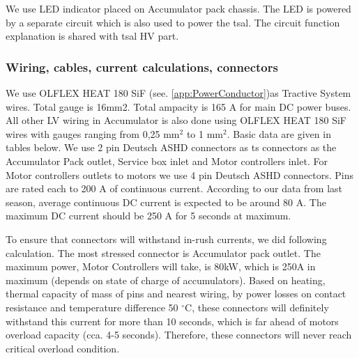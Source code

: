 We use LED indicator placed on Accumulator pack chassis. The LED is powered by a separate circuit which is also used to power the \gls{tsal}. The circuit function explanation is shared with \gls{tsal} HV part. 

\subsubsection{Wiring, cables, current calculations, connectors}\label{subsec:acp_wiring}


We use OLFLEX HEAT 180 SiF (see. \ref{app:PowerConductor})as Tractive System wires. Total gauge is 16mm2. Total ampacity is 165 A for main DC power buses. All other LV wiring in Accumulator is also done using OLFLEX HEAT 180 SiF wires with gauges ranging from 0,25 mm$^2$ to 1 mm$^2$. Basic data are given in tables below. We use 2 pin Deutsch ASHD connectors as \gls{ts} connectors as the Accumulator Pack outlet, Service box inlet and Motor controllers inlet. For Motor controllers outlets to motors we use 4 pin Deutsch ASHD connectors. Pins are rated each to 200 A of continuous current. According to our data from last season, average continuous DC current is expected to be around 80 A. The maximum DC current should be 250 A for 5 seconds at maximum.

To ensure that connectors will withstand in-rush currents, we did following calculation. The most stressed connector is Accumulator pack outlet. The maximum power, Motor Controllers will take, is 80kW, which is 250A in maximum (depends on state of charge of accumulators). Based on heating, thermal capacity of mass of pins and nearest wiring, by power losses on contact resistance and temperature difference 50 $^\circ$C, these connectors will definitely withstand this current for more than 10 seconds, which is far ahead of motors overload capacity (cca. 4-5 seconds). Therefore, these connectors will never reach critical overload condition.


